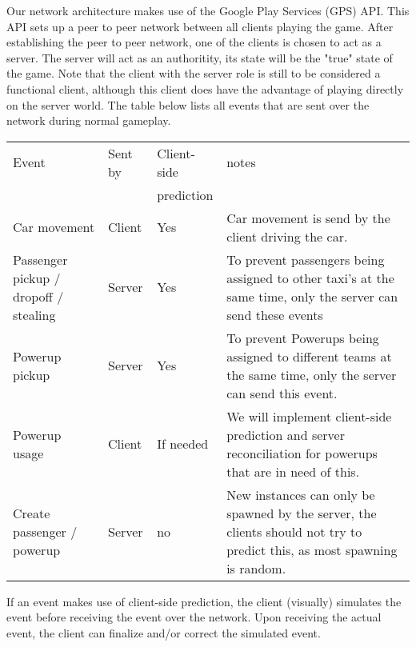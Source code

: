 Our network architecture makes use of the Google Play Services (GPS)  API. This API sets up a peer to peer network between all clients playing the game. After establishing the peer to peer network, one of the clients is chosen to act as a server. The server will act as an authoritity, its state will be the "true" state of the game. Note that the client with the server role is still to be considered a functional client, although this client does have the advantage of playing directly on the server world. The table below lists all events that are sent over the network during normal gameplay.
\begin{center}
    \begin{tabular}{ | p{3cm} | l | l | p{7cm} |}
    \hline
    Event & Sent by &  Client-side & notes\\
	  &	        & prediction  & \\ \hline
    Car movement & Client &Yes  & Car movement is send by the client driving the car. \\ \hline
    Passenger pickup / dropoff / stealing  & Server & Yes & To prevent passengers being assigned to other taxi's at the same time, only the server can send these events \\ \hline
   Powerup pickup & Server & Yes & To prevent Powerups being assigned to different teams at the same time, only the server can send this event. \\ \hline
 Powerup usage & Client & If needed  & We will implement client-side prediction and server reconciliation for powerups that are in need of this. \\ \hline
Create passenger / powerup & Server & no & New instances can only be spawned by the server, the clients should not try to predict this, as most spawning is random. \\ \hline
    \end{tabular}
\end{center}


If an event makes use of client-side prediction, the client (visually) simulates the event before receiving the event over the network. Upon receiving the actual event, the client can finalize and/or correct the simulated event.